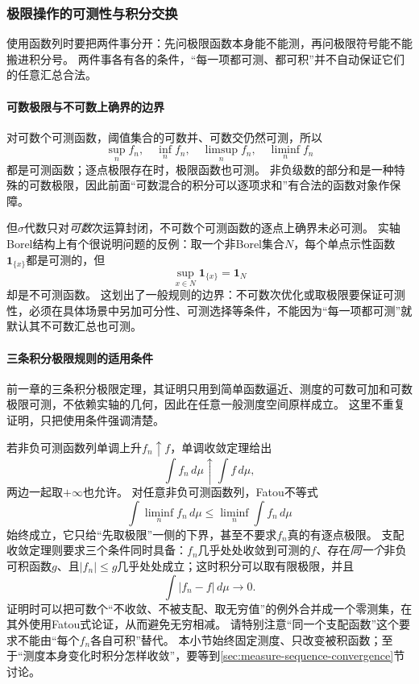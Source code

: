 \subsubsection{极限操作的可测性与积分交换}

使用函数列时要把两件事分开：先问极限函数本身能不能测，再问极限符号能不能搬进积分号。
两件事各有各的条件，“每一项都可测、都可积”并不自动保证它们的任意汇总合法。

\paragraph{可数极限与不可数上确界的边界}

对可数个可测函数，阈值集合的可数并、可数交仍然可测，所以
\[
 \sup_n f_n,\quad\inf_n f_n,\quad\limsup_n f_n,\quad\liminf_n f_n
\]
都是可测函数；逐点极限存在时，极限函数也可测。
非负级数的部分和是一种特殊的可数极限，因此前面“可数混合的积分可以逐项求和”有合法的函数对象作保障。

但$\sigma$代数只对\emph{可数}次运算封闭，不可数个可测函数的逐点上确界未必可测。
实轴Borel结构上有个很说明问题的反例：取一个非Borel集合$N$，每个单点示性函数$\mathbf 1_{\{x\}}$都是可测的，但
\[
 \sup_{x\in N}\mathbf 1_{\{x\}}=\mathbf 1_N
\]
却是不可测函数。
这划出了一般规则的边界：不可数次优化或取极限要保证可测性，必须在具体场景中另加可分性、可测选择等条件，不能因为“每一项都可测”就默认其不可数汇总也可测。

\paragraph{三条积分极限规则的适用条件}

前一章的三条积分极限定理，其证明只用到简单函数逼近、测度的可数可加和可数极限可测，不依赖实轴的几何，因此在任意一般测度空间原样成立。
这里不重复证明，只把使用条件强调清楚。

若非负可测函数列单调上升$f_n\uparrow f$，单调收敛定理给出
\[
 \int f_n\,d\mu\uparrow\int f\,d\mu,
\]
两边一起取$+\infty$也允许。
对任意非负可测函数列，Fatou不等式
\[
 \int\liminf_n f_n\,d\mu\leq\liminf_n\int f_n\,d\mu
\]
始终成立，它只给“先取极限”一侧的下界，甚至不要求$f_n$真的有逐点极限。
支配收敛定理则要求三个条件同时具备：$f_n$几乎处处收敛到可测的$f$、存在\emph{同一个}非负可积函数$g$、且$|f_n|\leq g$几乎处处成立；这时积分可以取有限极限，并且
\[
 \int|f_n-f|\,d\mu\to0.
\]
证明时可以把可数个“不收敛、不被支配、取无穷值”的例外合并成一个零测集，在其外使用Fatou式论证，从而避免无穷相减。
请特别注意“同一个支配函数”这个要求不能由“每个$f_n$各自可积”替代。
本小节始终固定测度、只改变被积函数；至于“测度本身变化时积分怎样收敛”，要等到\ref{sec:measure-sequence-convergence}节讨论。

